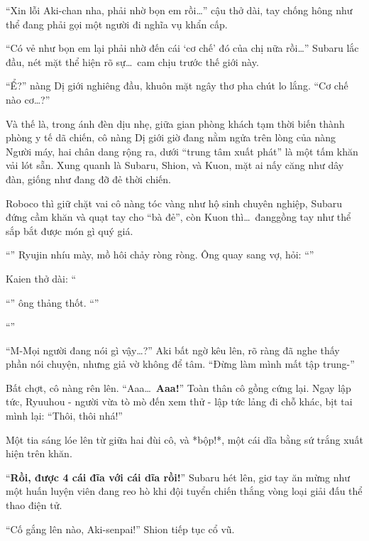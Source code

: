 \documentclass[../main.tex]{subfiles}
\begin{document}
``Xin lỗi Aki-chan nha, phải nhờ bọn em rồi\dots'' cậu thở dài, tay chống hông như thể đang phải gọi một người đi nghĩa vụ khẩn cấp.

``Có vẻ như bọn em lại phải nhờ đến cái `cơ chế' đó của chị nữa rồi\dots'' Subaru lắc đầu, nét mặt thể hiện rõ sự\dots\ cam chịu trước thế giới này.

``Ể?'' nàng Dị giới nghiêng đầu, khuôn mặt ngây thơ pha chút lo lắng. ``Cơ chế nào cơ\dots?''

\ct

Và thế là, trong ánh đèn dịu nhẹ, giữa gian phòng khách tạm thời biến thành phòng y tế dã chiến, cô nàng Dị giới giờ đang nằm ngửa trên lòng của nàng Người máy, hai chân dang rộng ra, dưới ``trung tâm xuất phát'' là một tấm khăn vải lót sẵn. Xung quanh là Subaru, Shion, và Kuon, mặt ai nấy căng như dây đàn, giống như đang đỡ đẻ thời chiến.

Roboco thì giữ chặt vai cô nàng tóc vàng như hộ sinh chuyên nghiệp, Subaru đứng cầm khăn và quạt tay cho ``bà đẻ'', còn Kuon thì\dots\ đanggồng tay như thể sắp bắt được món gì quý giá.

``'' Ryujin nhíu mày, mồ hôi chảy ròng ròng. Ông quay sang vợ, hỏi: ``''

Kaien thở dài: ``

``'' ông thảng thốt. ``''

``''

``M-Mọi người đang nói gì vậy\dots?'' Aki bất ngờ kêu lên, rõ ràng đã nghe thấy phần nói chuyện, nhưng giả vờ không để tâm. ``Đừng làm mình mất tập trung-''

Bất chợt, cô nàng rên lên. ``Aaa\dots\ \textbf{Aaa!}'' Toàn thân cô gồng cứng lại. Ngay lập tức, Ryuuhou - người vừa tò mò đến xem thử - lập tức lảng đi chỗ khác, bịt tai mình lại: ``Thôi, thôi nhá!''

Một tia sáng lóe lên từ giữa hai đùi cô, và *bộp!*, một cái dĩa bằng sứ trắng xuất hiện trên khăn.

``\textbf{Rồi, được 4 cái đĩa với cái dĩa rồi!}'' Subaru hét lên, giơ tay ăn mừng như một huấn luyện viên đang reo hò khi đội tuyển chiến thắng vòng loại giải đấu thể thao điện tử.

``Cố gắng lên nào, Aki-senpai!'' Shion tiếp tục cổ vũ.
\end{document}
